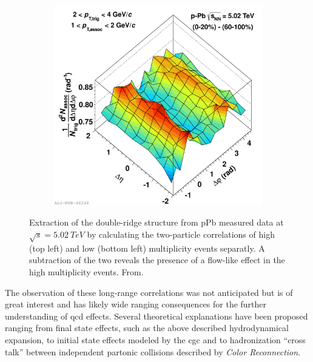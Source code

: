 \begin{figure}
\begin{subfigure}[m]{.4\textwidth}
\begin{subfigure}[b]{\textwidth}
    \end{subfigure}
  \end{subfigure}%
  \begin{subfigure}[m]{.6\textwidth}
    \includegraphics[width=\textwidth]{figures/ty_sub_exampel.pdf}
  \end{subfigure}
  \caption[Extraction of the double-ridge structure from pPb measured data at $\sqrt{s}=\SI{5.02}{TeV}$.]{Extraction of the double-ridge structure from pPb measured data at $\sqrt{s}=\SI{5.02}{TeV}$ by calculating the two-particle correlations of high (top left) and low (bottom left) multiplicity events separatly. A subtraction of the two reveals the presence of a flow-like effect in the high multiplicity events. From\cite{Grosse2012_cent,Grosse2012_peri,Grosse2012_sub}.}
  \label{fig:double_ridge_pPb}
\end{figure}

The observation of these long-range \deta correlations was not anticipated but is of great interest and has likely wide ranging consequences for the further understanding of \gls{qcd} effects. Several theoretical explanations have been proposed ranging from final state effects, such as the above described hydrodynamical expansion, to initial state effects modeled by the \gls{cgc} and to hadronization ``cross talk'' between independent partonic collisions described by \emph{Color Reconnection}.

